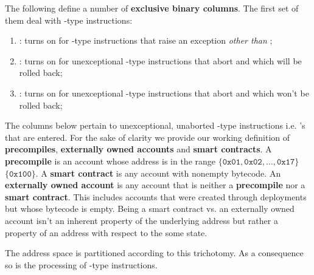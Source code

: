 The following define a number of \textbf{exclusive binary columns}.
The first set of them deal with -type instructions:
\begin{enumerate}
	\item \scenCallException:
		turns on for -type instructions that raise an exception \emph{other than} \suxSH{};
	\item \scenCallAbortWillRevert:
		turns on for unexceptional -type instructions that abort and which will be rolled back;
	\item \scenCallAbortWontRevert:
		turns on for unexceptional -type instructions that abort and which won't be rolled back;
\end{enumerate}
The columns below pertain to unexceptional, unaborted -type instructions i.e. 's that are entered. 
For the sake of clarity we provide our working definition of \textbf{precompiles}, \textbf{externally owned accounts} and \textbf{smart contracts}.
A \textbf{precompile} is an account whose address is in the range $\{\texttt{0x01},\texttt{0x02},\dots, \texttt{0x17}\}$ \cup $\{\texttt{0x100}\}$.
A \textbf{smart contract} is any account with nonempty bytecode.
An \textbf{externally owned account} is any account that is neither a \textbf{precompile} nor a \textbf{smart contract}. 
This includes accounts that were created through deployments but whose bytecode is empty.
Being a smart contract vs. an externally owned account isn't an inherent property of the underlying address but rather a property of an address with respect to the some state. 

\saNote{} The address space is partitioned according to this trichotomy. As a consequence so is the processing of -type instructions.

